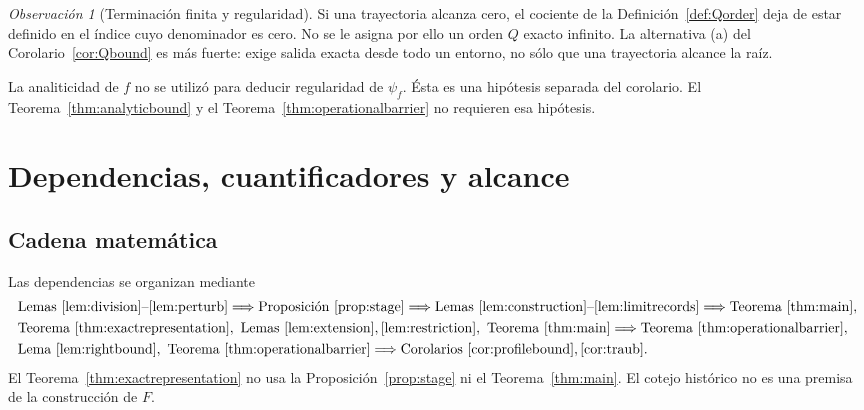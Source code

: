 \documentclass[11pt,a4paper]{article}
\numberwithin{equation}{section}
\theoremstyle{definition}
\theoremstyle{remark}
\newtheorem{remark}[theorem]{Observación}
\begin{document}
\begin{remark}[Terminación finita y regularidad]
Si una trayectoria alcanza cero, el cociente de la Definición~\ref{def:Qorder} deja de estar definido en el índice cuyo denominador es cero. No se le asigna por ello un orden $Q$ exacto infinito. La alternativa (a) del Corolario~\ref{cor:Qbound} es más fuerte: exige salida exacta desde todo un entorno, no sólo que una trayectoria alcance la raíz.

La analiticidad de $f$ no se utilizó para deducir regularidad de $\psi_f$. Ésta es una hipótesis separada del corolario. El Teorema~\ref{thm:analyticbound} y el Teorema~\ref{thm:operationalbarrier} no requieren esa hipótesis.
\end{remark}

\par\bigskip
\section{Dependencias, cuantificadores y alcance}\label{sec:dependencies}

\subsection{Cadena matemática}
Las dependencias se organizan mediante
\[
\begin{aligned}
&\text{Lemas }\ref{lem:division}\text{--}\ref{lem:perturb}
\Longrightarrow\text{Proposición }\ref{prop:stage}
\Longrightarrow\text{Lemas }\ref{lem:construction}\text{--}\ref{lem:limitrecords}
\Longrightarrow\text{Teorema }\ref{thm:main},\\
&\text{Teorema }\ref{thm:exactrepresentation},\ \text{Lemas }\ref{lem:extension},\ref{lem:restriction},\ \text{Teorema }\ref{thm:main}
\Longrightarrow\text{Teorema }\ref{thm:operationalbarrier},\\
&\text{Lema }\ref{lem:rightbound},\ \text{Teorema }\ref{thm:operationalbarrier}
\Longrightarrow\text{Corolarios }\ref{cor:profilebound},\ref{cor:traub}.
\end{aligned}
\]
El Teorema~\ref{thm:exactrepresentation} no usa la Proposición~\ref{prop:stage} ni el Teorema~\ref{thm:main}. El cotejo histórico no es una premisa de la construcción de $F$.
\end{document}
